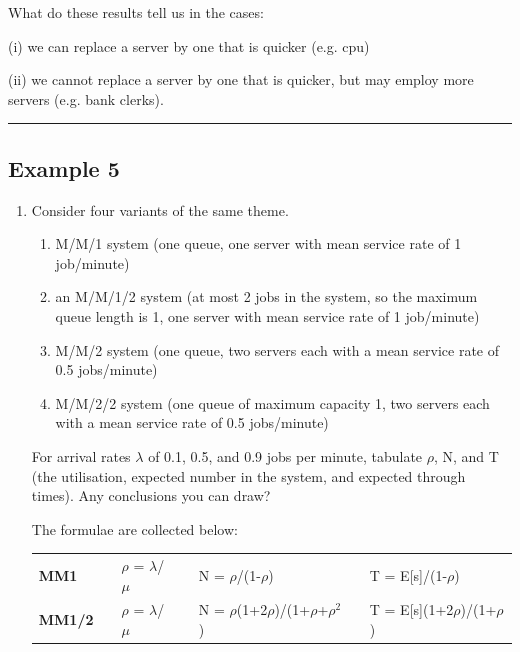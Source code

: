 \documentclass[12pt,fleqn]{report}
\begin{document}
\noindent
What do these results tell us in the cases:

(i) we can replace a server by one that is quicker (e.g. cpu)

(ii) we cannot replace a server by one that is quicker, but
may employ more servers (e.g. bank clerks).

\noindent
\hfill{\rule{160mm}{0.5mm}}

\subsection*{Example 5}

\begin{enumerate}
\item Consider four variants of the same theme. 

\begin{enumerate}

\item M/M/1 system (one queue, one server with
          mean service rate of 1 job/minute)

\item an M/M/1/2 system (at most 2 jobs in the system,
so the maximum queue length is 1,
one server with mean service rate of 1 job/minute)

\item M/M/2 system (one queue, two servers each with a
          mean service rate of 0.5 jobs/minute)

\item M/M/2/2 system (one queue of maximum capacity 1, 
    two servers each with a mean service rate of 0.5 jobs/minute)

\end{enumerate}

For arrival rates $\lambda$ of 0.1, 0.5, and 0.9 jobs per minute,
tabulate $\rho$, N, and T (the utilisation, 
expected number in the system, and
expected through times).
Any conclusions you can draw?


The formulae are collected below:

\begin{center}
\begin{tabular}{lc lc lc l}
{\bf MM1} & & $\rho$ = ${\lambda}$/${\mu}$ &&
          N  = $\rho$/(1-$\rho$)&&
          T =  E[s]/(1-$\rho$)\\[0.1in]

{\bf MM1/2} & & $\rho$ = ${\lambda}$/${\mu}$ &&
          N  = $\rho$(1+2$\rho$)/(1+$\rho$+$\rho^2$)&&
          T =  E[s](1+2$\rho$)/(1+$\rho$)\\[0.1in]


\end{tabular}
\end{center}
\end{enumerate}
\end{document}
